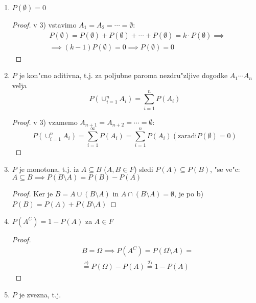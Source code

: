 \documentclass[a4paper,12pt]{article}
\theoremstyle{definition}
\theoremstyle{remark}
\begin{document}
\begin{enumerate}
    \item $P(\emptyset) = 0$
        \begin{proof}
            v 3) vstavimo $A_1 = A_2 = \cdots = \emptyset$:
            \begin{align*}
                &P(\emptyset) = P(\emptyset) + P(\emptyset) + \cdots + P(\emptyset) = k \cdot P(\emptyset) \implies \\
                &\implies (k-1) P(\emptyset) = 0 \implies P(\emptyset) = 0
            \end{align*}
        \end{proof}
    \item $P$ je kon"cno aditivna, t.j. za poljubne paroma nezdru"zljive dogodke $A_1 \cdots A_n$ velja
        \begin{equation*}
            P(\cup_{i=1}^n A_i) = \sum_{i=1}^{n} P(A_i)
        \end{equation*}
        \begin{proof}
            v 3) vzamemo $A_{n+1} = A_{n+2} = \cdots = \emptyset$:
            \begin{equation*}
                P(\cup_{i=1}^n A_i) = \sum_{i=1}^{\infty} P(A_i) = \sum_{i=1}^{n} P(A_i)
                (\text{zaradi} P(\emptyset) = 0)
            \end{equation*}
        \end{proof}
    \item $P$ je monotona, t.j. iz $A \subseteq B$ ($A,B \in F$) sledi $P(A) \subseteq P(B)$, "se ve"c:
        $A \subseteq B \implies P(B \text{\textbackslash} A) = P(B) - P(A)$
        \begin{proof}
            Ker je $B = A \cup (B \text{\textbackslash} A)$ in $A \cap (B \text{\textbackslash} A) = \emptyset$,
            je po b) $P(B) = P(A) + P(B \text{\textbackslash} A)$
        \end{proof}
    \item $P(A^C) = 1 - P(A)$ za $A \in F$
        \begin{proof}
            \begin{align*}
                &B = \Omega \implies P(A^C) = P(\Omega \text{\textbackslash} A) = \\
                &\stackrel{c)}{=} P(\Omega) - P(A) \stackrel{2)}{=} 1 - P(A)
            \end{align*}
        \end{proof}
    \item $P$ je zvezna, t.j.

\end{enumerate}
\end{document}
